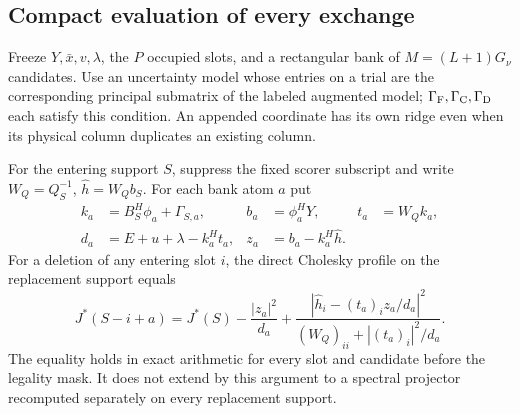 \subsection{Compact evaluation of every exchange}

\begin{afdmprop}
\label{prop:af-exchange}
Freeze $Y,\bar x,v,\lambda$, the $P$ occupied slots, and a rectangular
bank of $M=(L+1)G_\nu$ candidates. Use an uncertainty model whose entries
on a trial are the corresponding principal submatrix of the labeled
augmented model; $\Gamma_{\rm F},\Gamma_{\rm C},\Gamma_{\rm D}$ each
satisfy this condition. An appended coordinate has its own ridge even
when its physical column duplicates an existing column.

For the entering support $S$, suppress the fixed scorer subscript and
write $W_Q=Q_S^{-1}$, $\hat h= W_Qb_S$. For each bank atom $a$ put
\[
 \begin{aligned}
 k_a&=B_S^H\phi_a+\Gamma_{S,a},&
 b_a&=\phi_a^HY,&
 t_a&=W_Qk_a,\\
 d_a&=E+u+\lambda-k_a^Ht_a,&
 z_a&=b_a-k_a^H\hat h .
 \end{aligned}
\]
For a deletion of any entering slot $i$, the direct Cholesky profile on
the replacement support equals
\begin{equation}
 J^*(S-i+a)
 =
 J^*(S)-\frac{|z_a|^2}{d_a}
 +\frac{|\hat h_i-(t_a)_i z_a/d_a|^2}
        {(W_Q)_{ii}+|(t_a)_i|^2/d_a}.                   \label{eq:af-exchange}
\end{equation}
The equality holds in exact arithmetic for every slot and candidate
before the legality mask. It does not extend by this argument to a
spectral projector recomputed separately on every replacement support.
\end{afdmprop}


